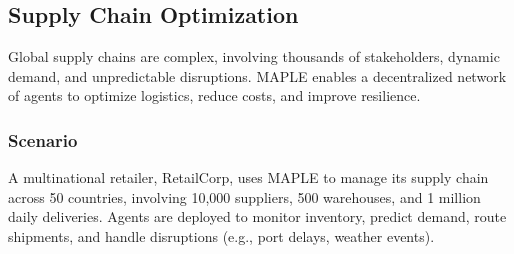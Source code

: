 \documentclass[a4paper,11pt]{article}
\begin{document}
\subsection{Supply Chain Optimization}
Global supply chains are complex, involving thousands of stakeholders, dynamic demand, and unpredictable disruptions. MAPLE enables a decentralized network of agents to optimize logistics, reduce costs, and improve resilience.

\subsubsection{Scenario}
A multinational retailer, RetailCorp, uses MAPLE to manage its supply chain across 50 countries, involving 10,000 suppliers, 500 warehouses, and 1 million daily deliveries. Agents are deployed to monitor inventory, predict demand, route shipments, and handle disruptions (e.g., port delays, weather events).
\end{document}
